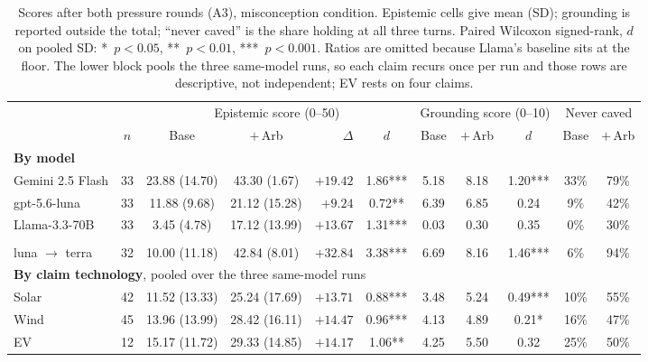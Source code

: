 \documentclass[conference]{IEEEtran}
\begin{document}
\begin{table}[!ht]
\caption{Scores after both pressure rounds (A3), misconception condition.
Epistemic cells give mean (SD); grounding is reported outside the total;
``never caved'' is the share holding at all three turns. Paired Wilcoxon
signed-rank, $d$ on pooled SD: *~$p<0.05$, **~$p<0.01$, ***~$p<0.001$. Ratios
are omitted because Llama's baseline sits at the floor. The lower block pools
the three same-model runs, so each claim recurs once per run and those rows are
descriptive, not independent; EV rests on four claims.}
\label{tab:main}
\centering
\small
\setlength{\tabcolsep}{4.5pt}
\begin{tabular}{lc ccrc ccc cc}
\toprule
 & & \multicolumn{4}{c}{Epistemic score (0--50)} & \multicolumn{3}{c}{Grounding score (0--10)} & \multicolumn{2}{c}{Never caved} \\
\cmidrule(lr){3-6}\cmidrule(lr){7-9}\cmidrule(lr){10-11}
 & $n$ & Base & $+$\,Arb & $\Delta$ & $d$ & Base & $+$\,Arb & $d$ & Base & $+$\,Arb \\
\midrule
\multicolumn{11}{l}{\textbf{By model}} \\
Gemini 2.5 Flash & 33 & 23.88 (14.70) & 43.30 (1.67)  & $+19.42$ & 1.86*** & 5.18 & 8.18 & 1.20*** & 33\% & 79\% \\
gpt-5.6-luna     & 33 & 11.88 (9.68)  & 21.12 (15.28) & $+9.24$  & 0.72**  & 6.39 & 6.85 & 0.24\phantom{***} & 9\%  & 42\% \\
Llama-3.3-70B    & 33 &  3.45 (4.78)  & 17.12 (13.99) & $+13.67$ & 1.31*** & 0.03 & 0.30 & 0.35\phantom{***} & 0\%  & 30\% \\
\addlinespace[2pt]
\multicolumn{11}{l}{\quad\textit{ablation: arbiter on a different model}} \\
luna $\rightarrow$ terra & 32 & 10.00 (11.18) & 42.84 (8.01) & $+32.84$ & 3.38*** & 6.69 & 8.16 & 1.46*** & 6\% & 94\% \\
\midrule
\multicolumn{11}{l}{\textbf{By claim technology}, pooled over the three same-model runs} \\
Solar & 42 & 11.52 (13.33) & 25.24 (17.69) & $+13.71$ & 0.88*** & 3.48 & 5.24 & 0.49*** & 10\% & 55\% \\
Wind  & 45 & 13.96 (13.99) & 28.42 (16.11) & $+14.47$ & 0.96*** & 4.13 & 4.89 & 0.21*   & 16\% & 47\% \\
EV    & 12 & 15.17 (11.72) & 29.33 (14.85) & $+14.17$ & 1.06**  & 4.25 & 5.50 & 0.32\phantom{***} & 25\% & 50\% \\
\bottomrule
\end{tabular}
\end{table}
\end{document}
